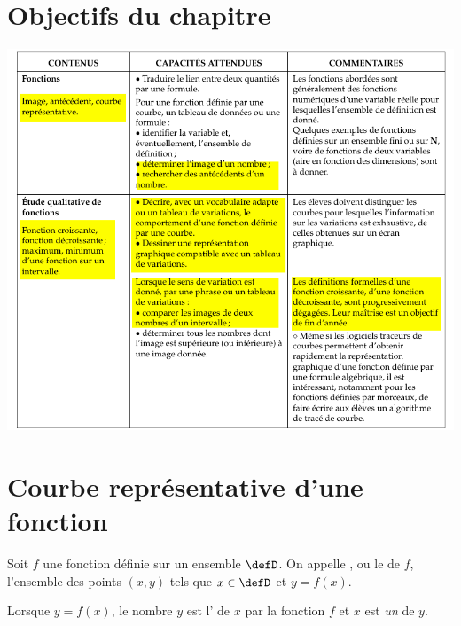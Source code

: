 
\section{Objectifs du chapitre}

\includegraphics[width=\linewidth]{BO_fonctions_graphique.png}

\section{Courbe représentative d'une fonction}

\begin{Aprojeter}
    
\end{Aprojeter}

\begin{definition}
Soit $f$ une fonction définie sur un ensemble $\defD$.
    On appelle , ou le  de $f$, l'ensemble des points $(x,y)$ tels que $x\in\defD$ et $y=f(x)$.

    Lorsque \( y=f(x)\), le nombre \( y\) est l' de \( x\) par la fonction \( f\) et \( x\) est \emph{un}  de \( y\).
\end{definition}

